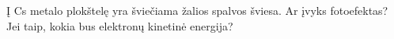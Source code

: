 \question Į Cs metalo plokštelę yra šviečiama žalios spalvos šviesa. Ar įvyks fotoefektas? Jei taip, kokia bus elektronų kinetinė energija?